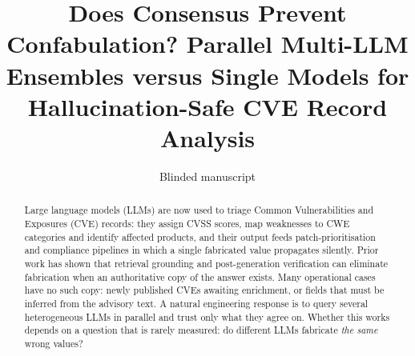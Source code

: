 \documentclass[11pt]{article}
\title{Does Consensus Prevent Confabulation? Parallel Multi-LLM Ensembles versus Single Models for Hallucination-Safe CVE Record Analysis}
\author{Blinded manuscript}
\date{}
\begin{document}
\maketitle
{}

\begin{abstract}
Large language models (LLMs) are now used to triage Common Vulnerabilities and Exposures (CVE) records: they assign CVSS scores, map weaknesses to CWE categories and identify affected products, and their output feeds patch-prioritisation and compliance pipelines in which a single fabricated value propagates silently. Prior work has shown that retrieval grounding and post-generation verification can eliminate fabrication when an authoritative copy of the answer exists. Many operational cases have no such copy: newly published CVEs awaiting enrichment, or fields that must be inferred from the advisory text. A natural engineering response is to query several heterogeneous LLMs in parallel and trust only what they agree on. Whether this works depends on a question that is rarely measured: do different LLMs fabricate \emph{the same} wrong values?


\end{abstract}
\end{document}
